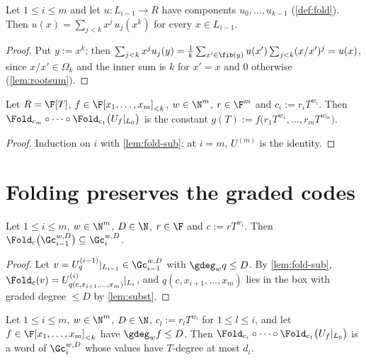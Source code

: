 \begin{lemma}[Inversion]\label{lem:fold-invert}
Let $1\le i\le m$ and let $u:L_{i-1}\to R$ have components $u_0,\dots,u_{k-1}$
(\ref{def:fold}). Then $u(x)=\sum_{j<k}x^j\,u_j(x^k)$ for every $x\in L_{i-1}$.
\end{lemma}

\begin{proof}
Put $y:=x^k$; then $\sum_{j<k}x^ju_j(y)=\frac1k\sum_{x'\in\fib(y)}u(x')\sum_{j<k}(x/x')^j=u(x)$,
since $x/x'\in\Omega_k$ and the inner sum is $k$ for $x'=x$ and $0$ otherwise
(\ref{lem:rootsum}).
\end{proof}

\begin{corollary}\label{cor:terminal}
Let $R=\F[T]$, $f\in\F[x_1,\dots,x_m]_{<k}$, $w\in\N^m$, $r\in\F^m$ and
$c_i:=r_iT^{w_i}$. Then $\Fold_{c_m}\circ\cdots\circ\Fold_{c_1}\big(U_f|_{L_0}\big)$ is the
constant $g(T):=f\big(r_1T^{w_1},\dots,r_mT^{w_m}\big)$.
\end{corollary}

\begin{proof}
Induction on $i$ with \ref{lem:fold-sub}; at $i=m$, $U^{(m)}$ is the identity.
\end{proof}

\section{Folding preserves the graded codes}

\begin{lemma}[Stability]\label{lem:stab}
Let $1\le i\le m$, $w\in\N^m$, $D\in\N$, $r\in\F$ and $c:=rT^{w_i}$. Then
$\Fold_c\big(\Gc_{i-1}^{w,D}\big)\subseteq\Gc_i^{w,D}$.
\end{lemma}

\begin{proof}
Let $v=U^{(i-1)}_q|_{L_{i-1}}\in\Gc_{i-1}^{w,D}$ with $\gdeg_wq\le D$. By \ref{lem:fold-sub},
$\Fold_c(v)=U^{(i)}_{q(c,x_{i+1},\dots,x_m)}|_{L_i}$, and $q(c,x_{i+1},\dots,x_m)$ lies in the box
with graded degree $\le D$ by \ref{lem:subst}.
\end{proof}

\begin{lemma}\label{lem:stab-cap}
Let $1\le i\le m$, $w\in\N^m$, $D\in\N$, $c_l:=r_lT^{w_l}$ for $1\le l\le i$, and let
$f\in\F[x_1,\dots,x_m]_{<k}$ have $\gdeg_wf\le D$. Then
$\Fold_{c_i}\circ\cdots\circ\Fold_{c_1}\big(U_f|_{L_0}\big)$ is a word of $\Gc_i^{w,D}$ whose values
have $T$-degree at most $d_i$.
\end{lemma}

